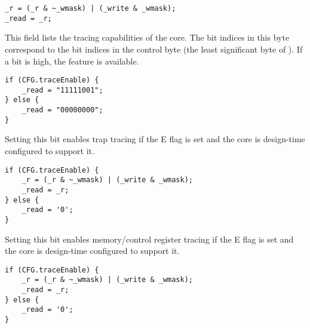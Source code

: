 \signed{}
\declaration{}
\implementation{}
\begin{lstlisting}
_r = (_r & ~_wmask) | (_write & _wmask);
_read = _r;
\end{lstlisting}

This field lists the tracing capabilities of the core. The bit indices in this
byte correspond to the bit indices in the control byte (the least significant
byte of ). If a bit is high, the feature is available.

\implementation{}
\begin{lstlisting}
if (CFG.traceEnable) {
    _read = "11111001";
} else {
    _read = "00000000";
}
\end{lstlisting}

Setting this bit enables trap tracing if the E flag is set and the core is 
design-time configured to support it.

\declaration{}
\implementation{}
\begin{lstlisting}
if (CFG.traceEnable) {
    _r = (_r & ~_wmask) | (_write & _wmask);
    _read = _r;
} else {
    _read = '0';
}
\end{lstlisting}

Setting this bit enables memory/control register tracing if the E flag is set 
and the core is design-time configured to support it.

\declaration{}
\implementation{}
\begin{lstlisting}
if (CFG.traceEnable) {
    _r = (_r & ~_wmask) | (_write & _wmask);
    _read = _r;
} else {
    _read = '0';
}
\end{lstlisting}

